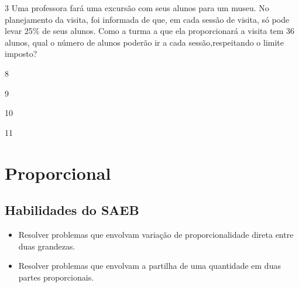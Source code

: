 \num{3} Uma professora fará uma excursão com seus alunos para um museu. No
planejamento da visita, foi informada de que, em cada sessão de visita, só
pode levar 25\% de seus alunos. Como a turma a que ela proporcionará a
visita tem 36 alunos, qual o número de alunos poderão ir a cada sessão,respeitando o limite imposto?

\begin{minipage}{.5\textwidth}
\begin{escolha}
\item
  8
\item
  9
\item
  10
\item
  11
\end{escolha}
\end{minipage}

\chapter{Proporcional}


\section{Habilidades do SAEB}

\begin{itemize}
\item Resolver problemas que envolvam variação de proporcionalidade direta
entre duas grandezas.

\item Resolver problemas que envolvam a partilha de uma quantidade em duas
partes proporcionais.
\end{itemize}

